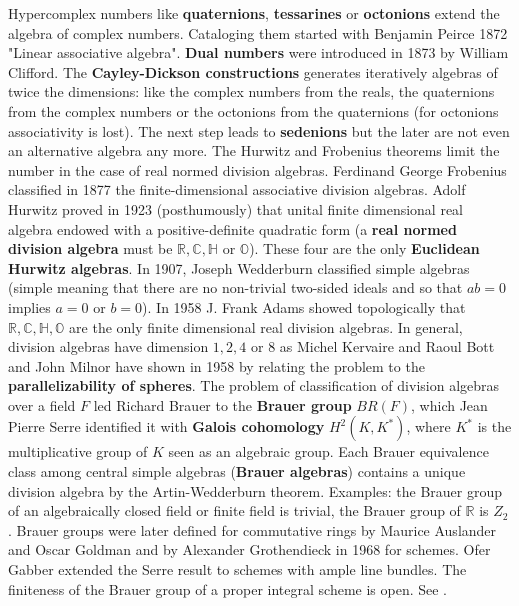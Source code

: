 \documentclass[12pt]{amsart}
\begin{document}
Hypercomplex numbers like {\bf quaternions}, {\bf tessarines} or {\bf octonions} extend the algebra of
complex numbers. Cataloging them started with Benjamin Peirce 1872 "Linear associative algebra".
{\bf Dual numbers} were introduced in 1873 by William Clifford.
The {\bf Cayley-Dickson constructions} generates iteratively algebras of twice the dimensions:
like the complex numbers from the reals, the quaternions from the complex numbers or the octonions
from the quaternions (for octonions associativity is lost). 
The next step leads to {\bf sedenions} but the later are not even an alternative algebra any more.
The Hurwitz and Frobenius theorems limit the number in the case of real normed division algebras.
Ferdinand George Frobenius classified in 1877 the finite-dimensional associative division algebras.
Adolf Hurwitz proved in 1923 (posthumously) that unital finite dimensional real algebra endowed with 
a positive-definite quadratic form (a {\bf real normed division algebra} must be 
$\mathbb{R},\mathbb{C},\mathbb{H}$ or $\mathbb{O}$). 
These four are the only {\bf Euclidean Hurwitz algebras}.
In 1907, Joseph Wedderburn classified simple algebras 
(simple meaning that there are no non-trivial two-sided ideals and so that $ab=0$ implies $a=0$ or $b=0$).
In 1958 J. Frank Adams showed topologically
that $\mathbb{R},\mathbb{C},\mathbb{H},\mathbb{O}$ are the only finite dimensional
real division algebras. In general, division algebras have dimension $1,2,4$ or $8$ as Michel Kervaire 
and Raoul Bott and John Milnor have shown in 1958 by relating the problem 
to the {\bf parallelizability of spheres}. 
The problem of classification of division algebras over a field $F$
led Richard Brauer to the {\bf Brauer group} $BR(F)$, which Jean Pierre Serre identified it with
{\bf Galois cohomology} $H^2(K,K^*)$, where $K^*$ is the multiplicative group of $K$ seen as an algebraic group.
Each Brauer equivalence class among central simple algebras ({\bf Brauer algebras}) contains a unique
division algebra by the Artin-Wedderburn theorem. Examples: the Brauer group of an algebraically closed field
or finite field is trivial, the Brauer group of $\mathbb{R}$ is $Z_2$. Brauer groups were later defined
for commutative rings by Maurice Auslander and Oscar Goldman and by Alexander Grothendieck in 1968 for schemes.
Ofer Gabber extended the Serre result to schemes with ample line bundles. The finiteness of the Brauer
group of a proper integral scheme is open.  See \cite{Baez2002,FarbDennis}.
\end{document}
